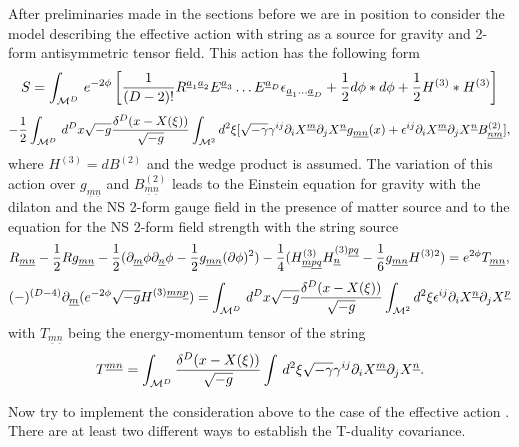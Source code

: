 \documentclass[a4paper,11pt]{article}
\begin{document}
After preliminaries made in the sections before we are in position to
consider the model describing the effective action with
string as a source for gravity and 2-form antisymmetric tensor field.
This action has the following form \cite{dkl}
$$
S=\int_{{\cal M}^D}\, e^{-2\phi}\left[ {1\over (D-2)!}R^{{\underline
a}_1{\underline a}_2}E^{{\underline a}_3}\dots E^{{\underline
a}_D}\epsilon_{{\underline a}_1\dots {\underline a}_D} 
+{1\over 2}d\phi \ast d\phi
+{1\over
2}H^{(3)}\ast H^{(3)} \right]
$$
\begin{equation}\plabel{Seff}
-{1\over 2}\int_{{\cal M}^D}\,d^D x \sqrt{-g}{\d^D (x-X(\xi))\over
\sqrt{-g}}
\int_{{\cal M}^2} d^2 \xi
[\sqrt{-\g}\g^{ij}\partial_i X^{\underline m}
\partial_j X^{\underline n}g_{\underline{mn}}(x)
+\e^{ij}\partial_i X^{\underline m}\partial_j X^{\underline n}
B^{(2)}_{\underline{n}\underline{m}}],
\end{equation}
where $H^{(3)}=dB^{(2)}$ and the wedge product is assumed. The
variation of this action over $g_{\underline{m}\underline{n}}$
and $B^{(2)}_{\underline{m}\underline{n}}$ leads to the Einstein
equation for gravity with the dilaton and the NS 2-form gauge field in the 
presence of matter source
and to the equation for the NS 2-form field strength with the string
source
\begin{equation}\plabel{EEs}
R_{\underline{m}\underline{n}}-{1\over 2}R
g_{\underline{m}\underline{n}}
-{1\over 2}(\partial_{\underline m}\phi \partial_{\underline n}\phi
-{1\over 2}g_{\underline{m}\underline{n}}(\partial \phi)^2)
-{1\over
4}(H^{(3)}_{\underline{m}\underline{p}\underline{q}}H_{\underline
n}^{(3) \underline{p}\underline{q}}-{1\over
6}g_{\underline{m}\underline{n}}H^{(3) 2})
=e^{2\phi} T_{\underline{m}\underline{n}},
\end{equation}
\begin{equation}\plabel{Hs}
(-)^{(D-4)}\partial_{\underline
m}(e^{-2\phi}\sqrt{-g}H^{(3)\underline{m}\underline{n}\underline{p}})=
\int_{{\cal M}^D}\,d^D x \sqrt{-g}{\d^D (x-X(\xi))\over
\sqrt{-g}}
\int_{{\cal M}^2} d^2 \xi
\e^{ij}\partial_i X^{\underline n}\partial_j X^{\underline p}
\end{equation}
with $T_{\underline{m}\underline{n}}$ being the energy-momentum
tensor of the string
$$
T^{\underline{m}\underline{n}}=\int_{{\cal M}^D} {\delta^D (x-X(\xi))\over
\sqrt{-g}}\int\, d^2 \xi \sqrt{-\gamma}\gamma^{ij}\partial_i X^{\underline m}
\partial_j X^{\underline n}.
$$

Now try to implement the consideration above to the case of the effective
action . There are at least two different ways to establish the
T-duality covariance.
\end{document}
